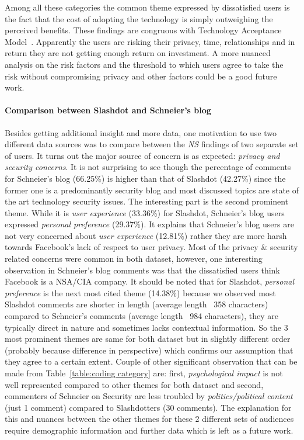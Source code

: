 Among all these categories the common theme expressed by dissatisfied users is the fact that the cost of adopting the technology is simply outweighing the perceived benefits. These findings are congruous with Technology Acceptance Model~\cite{venkatesh2003user, davis1989perceived}. Apparently the users are risking their privacy, time, relationships and in return they are not getting enough return on investment. A more nuanced analysis on the risk factors and the threshold to which users agree to take the risk without compromising privacy and other factors could be a good future work. 


\paragraph{Comparison between Slashdot and Schneier's blog} 

Besides getting additional insight and more data, one motivation to use two different data sources was to compare between the \emph{NS} findings of two separate set of users. It turns out the major source of concern is as expected: \textit{privacy and security concerns}. It is not surprising to see though the percentage of comments for Schneier's blog (66.25\%) is higher than that of Slashdot (42.27\%) since the former one is a predominantly security blog and most discussed topics are state of the art technology security issues. The interesting part is the second prominent theme. While it is \textit{user experience} (33.36\%) for Slashdot, Schneier's blog users expressed \textit{personal preference} (29.37\%). It explains that Schneier's blog users are not very concerned about \textit{user experience} (12.81\%) rather they are more harsh towards Facebook's lack of respect to user privacy. Most of the privacy \& security related concerns were common in both dataset, however, one interesting observation in Schneier's blog comments was that the dissatisfied users think Facebook is a NSA/CIA company. It should be noted that for Slashdot, \textit{personal preference} is the next most cited theme (14.38\%) because we observed most Slashdot comments are shorter in length (average length ~358 characters) compared to Schneier's comments (average length ~984 characters), they are typically direct in nature and sometimes lacks contextual information. So the 3 most prominent themes are same for both dataset but in slightly different order (probably because difference in perspective) which confirms our assumption that they agree to a certain extent. Couple of other significant observation that can be made from Table~\ref{table:coding category} are: first, \textit{psychological impact} is not well represented compared to other themes for both dataset and second, commenters of Schneier on Security are less troubled by \textit{politics/political content} (just 1 comment) compared to Slashdotters (30 comments). The explanation for this and nuances between the other themes for these 2 different sets of audiences require demographic information and further data which is left as a future work.


